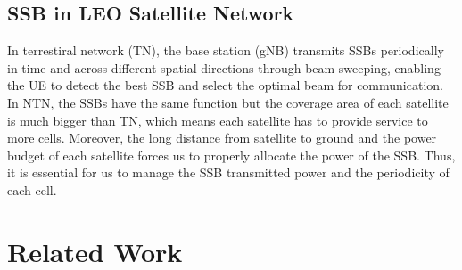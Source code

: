 \subsection{SSB in LEO Satellite Network}
In terrestiral network (TN), the base station (gNB) transmits SSBs periodically in time and across different spatial directions through beam sweeping, enabling the UE to detect the best SSB and select the optimal beam for communication. In NTN, the SSBs have the same function but the coverage area of each satellite is much bigger than TN, which means each satellite has to provide service to more cells. Moreover, the long distance from satellite to ground and the power budget of each satellite forces us to properly allocate the power of the SSB. Thus, it is essential for us to manage the SSB transmitted power and the periodicity of each cell.



\section{Related Work}


